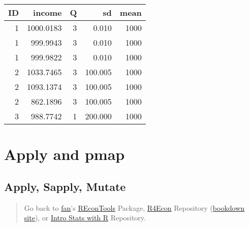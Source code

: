 \documentclass[
]{book}
\newenvironment{Shaded}{\begin{snugshade}}{\end{snugshade}}
\newcommand{\KeywordTok}[1]{\textcolor[rgb]{0.13,0.29,0.53}{\textbf{#1}}}
\newcommand{\NormalTok}[1]{#1}
\newcommand{\OperatorTok}[1]{\textcolor[rgb]{0.81,0.36,0.00}{\textbf{#1}}}
\newcommand{\StringTok}[1]{\textcolor[rgb]{0.31,0.60,0.02}{#1}}
\begin{document}
\begin{Shaded}
\end{Shaded}

\begin{table}[!h]
\centering
\begin{tabular}{r|r|r|r|r}
\hline
ID & income & Q & sd & mean\\
\hline
\rowcolor{gray!6}  1 & 1000.0183 & 3 & 0.010 & 1000\\
\hline
1 & 999.9943 & 3 & 0.010 & 1000\\
\hline
\rowcolor{gray!6}  1 & 999.9822 & 3 & 0.010 & 1000\\
\hline
2 & 1033.7465 & 3 & 100.005 & 1000\\
\hline
\rowcolor{gray!6}  2 & 1093.1374 & 3 & 100.005 & 1000\\
\hline
2 & 862.1896 & 3 & 100.005 & 1000\\
\hline
\rowcolor{gray!6}  3 & 988.7742 & 1 & 200.000 & 1000\\
\hline
\end{tabular}
\end{table}

\hypertarget{apply-and-pmap}{%
\section{Apply and pmap}\label{apply-and-pmap}}

\hypertarget{apply-sapply-mutate}{%
\subsection{Apply, Sapply, Mutate}\label{apply-sapply-mutate}}

\begin{quote}
Go back to \href{http://fanwangecon.github.io/CodeDynaAsset/}{fan}'s \href{https://fanwangecon.github.io/REconTools/}{REconTools} Package, \href{https://fanwangecon.github.io/R4Econ/}{R4Econ} Repository (\href{https://fanwangecon.github.io/R4Econ/bookdown}{bookdown site}), or \href{https://fanwangecon.github.io/Stat4Econ/}{Intro Stats with R} Repository.
\end{quote}
\end{document}
